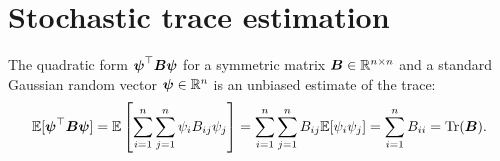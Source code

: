 \section{Stochastic trace estimation}
\label{sec:2-chebyshev-stochastic-trace-estimation}

The quadratic form $\boldsymbol{\psi}^{\top} \boldsymbol{B} \boldsymbol{\psi}$
for a symmetric matrix $\boldsymbol{B} \in \mathbb{R}^{n \times n}$ and a standard Gaussian
random vector $\boldsymbol{\psi} \in \mathbb{R}^n$ %
is an unbiased estimate of the trace:
\begin{equation}
    \mathbb{E}[\boldsymbol{\psi}^{\top} \boldsymbol{B} \boldsymbol{\psi}]
        = \mathbb{E}\left[\sum_{i=1}^n\sum_{j=1}^n \psi_i B_{ij} \psi_j\right]
        = \sum_{i=1}^n\sum_{j=1}^n B_{ij} \mathbb{E}[\psi_i\psi_j]
        = \sum_{i=1}^n B_{ii}
        = \operatorname{Tr}(\boldsymbol{B}).
    \label{equ:2-chebyshev-DGC-hutchinson}
\end{equation}

